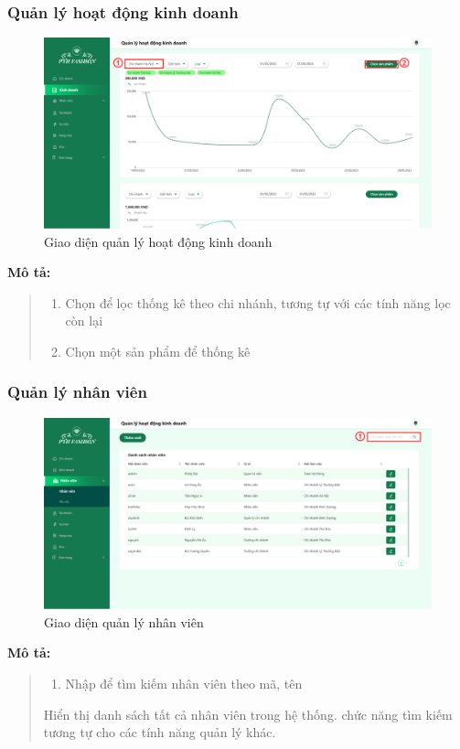 \newpage

\subsubsection{Quản lý hoạt động kinh doanh}
\begin{figure}[!htp]
    \centering
    \includegraphics[width=12cm]{img/UI/admin_implement/statistic.png}
    \newline
    \caption{Giao diện quản lý hoạt động kinh doanh}
\end{figure}
\textbf{Mô tả:}
\begin{quote}
    \begin{enumerate}
        \item Chọn để lọc thống kê theo chi nhánh, tương tự với các tính năng lọc còn lại
        \item Chọn một sản phẩm để thống kê
    \end{enumerate}
\end{quote}

\newpage


\subsubsection{Quản lý nhân viên}
\begin{figure}[!htp]
    \centering
    \includegraphics[width=12cm]{img/UI/admin_implement/staff.png}
    \newline
    \caption{Giao diện quản lý nhân viên}
\end{figure}
\textbf{Mô tả:}
\begin{quote}
    \begin{enumerate}
        \item Nhập để tìm kiếm nhân viên theo mã, tên
    \end{enumerate}
    Hiển thị danh sách tất cả nhân viên trong hệ thống. chức năng tìm kiếm tương tự cho các tính năng quản lý khác.
\end{quote}


